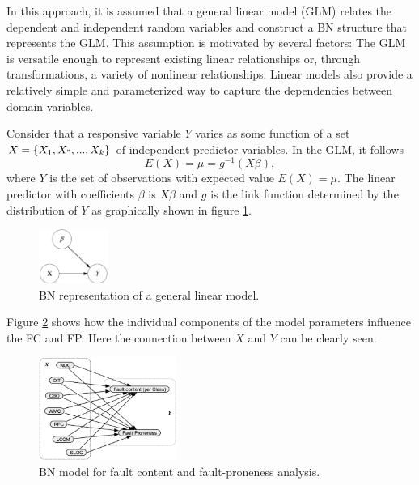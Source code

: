 In this approach, it is assumed that a general linear model (GLM) relates the dependent and independent random variables and construct a BN structure that represents the GLM. This assumption is motivated by several factors: The GLM is versatile enough to represent existing linear relationships or, through transformations, a variety of nonlinear relationships. Linear models also provide a relatively simple and parameterized way to capture the dependencies between domain variables. 
 
Consider that a responsive variable $Y$ varies as some function of a set $X=\{X_1,X_",...,X_k\}$ of independent predictor variables. In the GLM, it follows 
\begin{displaymath}
 	E(X)= \mu = g^{-1}(X\beta),
\end{displaymath}
where $Y$ is the set of observations with expected value $E(X)= \mu$. The linear predictor with coefficients $\beta$ is $X\beta$ and $g$ is the link function determined by the distribution of $Y$ as graphically shown in figure \ref{fig1bn}. 

\begin{figure}[htbp]
	\centerline{\includegraphics[width=0.2\textwidth]{pictures/bn1.png}}
	\caption{BN representation of a general linear model.}
	\label{fig1bn}
\end{figure}

Figure \ref{fig2bn} shows how the individual components of the model parameters influence the FC and FP. Here the connection between $X$ and $Y$ can be clearly seen.

\begin{figure}[htbp]
	\centerline{\includegraphics[width=0.4\textwidth]{pictures/bn2.png}}
	\caption{BN model for fault content and fault-proneness analysis.}
	\label{fig2bn}
\end{figure}

